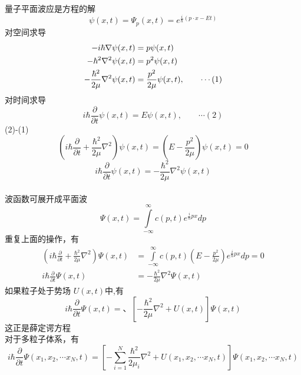 \begin{frame} [allowframebreaks=]
    \frametitle{}
    \alert{\faHeartbeat} 量子平面波应是方程的解 \[\psi(x,t)=\Psi_p(x,t)=e^{\frac{i}{\hbar}(p\cdot x-Et)} \]
    对空间求导
    \begin{equation*}
        \begin{split}
       -i\hbar \nabla \psi(x,t) &=p\psi(x,t) \\ \vspace{0.6em}
       -\hbar^2 \nabla^2 \psi(x,t) &=p^2\psi(x,t) \\
       -\frac{\hbar^2}{2\mu} \nabla^2 \psi(x,t) &=\frac{p^2}{2\mu} \psi(x,t) , \qquad \cdots (1)
        \end{split}
    \end{equation*}
    对时间求导
    \begin{equation*}
       i\hbar \frac{\partial }{\partial t} \psi(x,t) =E\psi(x,t)  , \qquad \cdots (2)
     \end{equation*}
    (2)-(1)
    \begin{equation*}
        (i\hbar \frac{\partial }{\partial t} + \frac{\hbar^2}{2\mu} \nabla^2 )\psi(x,t) =(E-\frac{p^2}{2\mu})\psi(x,t)=0  
    \end{equation*}
    \begin{equation*}
        i\hbar \frac{\partial }{\partial t} \psi(x,t) = -\frac{\hbar^2}{2\mu} \nabla^2 \psi(x,t)
    \end{equation*}
    ~~\\ 
    波函数可展开成平面波
    \begin{equation*}
        \Psi(x,t)= \int\limits_{-\infty} ^{\infty} c(p,t) e^{\frac{i}{\hbar}px}dp
    \end{equation*}
    重复上面的操作，有
    \begin{equation*}
        \begin{split}
        (i\hbar \frac{\partial }{\partial t} + \frac{\hbar^2}{2\mu} \nabla^2 )\Psi(x,t) &= \int\limits_{-\infty} ^{\infty} c(p,t) (E-\frac{p^2}{2\mu}) e^{\frac{i}{\hbar}px}dp=0  \\
        i\hbar \frac{\partial }{\partial t} \Psi(x,t) &= -\frac{\hbar^2}{2\mu} \nabla^2 \Psi(x,t)
        \end{split}
    \end{equation*}
    如果粒子处于势场 $U(x,t)$中,有
    \begin{equation*}
        \boxed{i\hbar \frac{\partial }{\partial t} \Psi(x,t) = 、\left[-\frac{\hbar^2}{2\mu} \nabla^2 +U(x,t)\right] \Psi(x,t)}
    \end{equation*}
    这正是薛定谔方程
    ~~\\
    {\Bullet} 对于多粒子体系，有
   {\small \begin{equation*}
        i\hbar \frac{\partial }{\partial t} \Psi(x_1, x_2, \cdots x_N,t) = \left[-\sum_{i=1} ^{N} \frac{\hbar ^2}{2\mu_i} \nabla^2 +U(x_1, x_2, \cdots x_N, t)\right] \Psi(x_1, x_2, \cdots x_N,t)
    \end{equation*}}
\end{frame}

